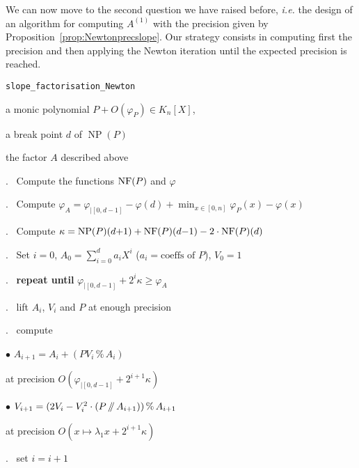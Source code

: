 \documentclass{sig-alternate-05-2015}
\DeclareMathOperator{\NP}{NP}
\newcommand{\NF}{\text{\rm NF}}
\renewcommand{\mod}{\,\%\,}
\renewcommand{\div}{\,/\hspace{-0.3em}/\,}
\theoremstyle{definition}
\begin{document}
We can now move to the second question we have raised before, 
\emph{i.e.} the design of an algorithm for computing $A^{(1)}$ with the 
precision given by Proposition~\ref{prop:Newtonprecslope}. Our strategy 
consists in computing first the precision and then applying the Newton 
iteration until the expected precision is reached. 

\noindent\hrulefill

 {\tt slope\_factorisation\_Newton}

 a monic polynomial $P + O(\varphi_P) \in K_n[X]$,

\noindent{}a break point $d$ of $\NP(P)$

 the factor $A$ described above

\smallskip{}.\ %
Compute the functions $\NF(P)$ and $\varphi$

\smallskip{}.\ %
Compute $\varphi_A = \varphi_{|[0,d-1]} - \varphi(d) + \min_{x \in [0,n]}
\varphi_P(x) - \varphi(x)$

\smallskip{}.\ %
Compute $\kappa = \NP(P)(d{+}1) + \NF(P)(d{-}1) - 2 \cdot \NF(P)(d)$

\smallskip{}.\ %
Set $i = 0$, $A_0 = \sum_{i=0}^d a_i X^i$
($a_i = \text{coeffs of } P$), $V_0 = 1$

\smallskip{}.\ %
{\bf repeat until} $\varphi_{|[0,d{-}1]} + 2^i \kappa \geq \varphi_A$

\smallskip{}.\ \hspace{5mm}%
lift $A_i$, $V_i$ and $P$ at enough precision

\smallskip{}.\ \hspace{5mm}%
compute 

\smallskip

\hspace{1cm}$\bullet$
$A_{i+1} = A_i + (P V_i \mod A_i)$

\hspace{1cm}\phantom{$\bullet$ }%
at precision $O(\varphi_{|[0,d{-}1]} + 2^{i+1} \kappa)$

\smallskip

\hspace{1cm}$\bullet$
$V_{i+1} = (2 V_i - V_i^2 \cdot (P \div A_{i+1})) \mod A_{i+1}$

\hspace{1cm}\phantom{$\bullet$ }%
at precision $O(x \mapsto \lambda_1 x + 2^{i+1}\kappa)$

\smallskip{}.\ \hspace{5mm}%
set $i = i+1$
\end{document}
